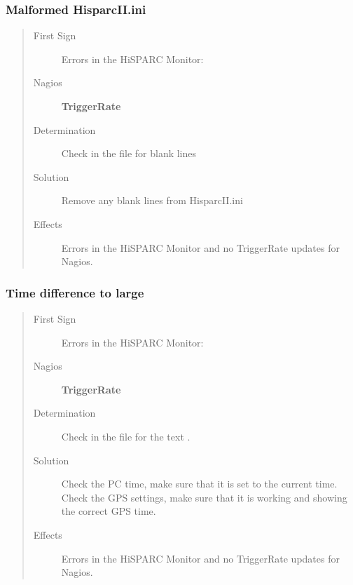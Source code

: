 \documentclass[a4paper,11pt,english]{sphinxmanual}
\begin{document}
\subsubsection{Malformed HisparcII.ini}
\label{known-issues:malformed-hisparcii-ini}\begin{quote}\begin{description}
\item[{First Sign}] \leavevmode
Errors in the HiSPARC Monitor: 

\item[{Nagios}] \leavevmode
\textbf{TriggerRate}

\item[{Determination}] \leavevmode
Check in the file  for blank lines

\item[{Solution}] \leavevmode
Remove any blank lines from HisparcII.ini

\item[{Effects}] \leavevmode
Errors in the HiSPARC Monitor and no TriggerRate updates for Nagios.

\end{description}\end{quote}


\subsubsection{Time difference to large}
\label{known-issues:time-difference-to-large}\begin{quote}\begin{description}
\item[{First Sign}] \leavevmode
Errors in the HiSPARC Monitor: 

\item[{Nagios}] \leavevmode
\textbf{TriggerRate}

\item[{Determination}] \leavevmode
Check in the file  for the text .

\item[{Solution}] \leavevmode
Check the PC time, make sure that it is set to the current time. Check the GPS settings, make sure that it is working and showing the correct GPS time.

\item[{Effects}] \leavevmode
Errors in the HiSPARC Monitor and no TriggerRate updates for Nagios.

\end{description}\end{quote}
\end{document}
